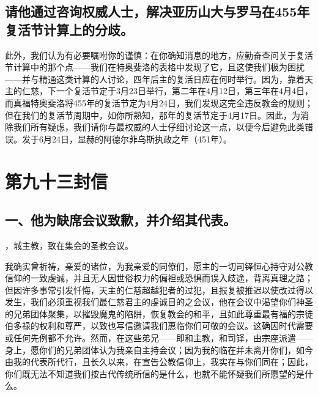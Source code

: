
\subsection{请他通过咨询权威人士，解决亚历山大与罗马在455年复活节计算上的分歧。}

此外，我们认为有必要嘱咐你的谨慎：在你确知消息的地方，应勤奋查问关于复活节计算中的那个点——我们在特奥斐洛的表格中发现了它，且这使我们极为困扰——并与精通这类计算的人讨论，四年后主的复活日应在何时举行。因为，靠着天主的仁慈，下一个复活节定于3月23日举行，第二年在4月12日，第三年在4月4日，而真福特奥斐洛将455年的复活节定为4月24日，我们发现这完全违反教会的规则；但在我们的复活节周期中，如你所熟知，那年的复活节定于4月17日。因此，为消除我们所有疑虑，我们请你与最权威的人士仔细讨论这一点，以便今后避免此类错误。发于6月24日，显赫的阿德尔菲乌斯执政之年（451年）。\par



\section{第九十三封信}

\par


\subsection{一、他为缺席会议致歉，并介绍其代表。}

，城主教，致在集会的圣教会议。\par

我确实曾祈祷，亲爱的诸位，为我亲爱的同僚们，愿主的一切司铎恒心持守对公教信仰的一致虔诚，并且无人因世俗权力的偏袒或恐惧而误入歧途，背离真理之路；但因许多事常引发忏悔，天主的仁慈超越犯者的过犯，且报复被推迟以使改过得以发生，我们必须重视我们最仁慈君主的虔诚目的之会议，他在会议中渴望你们神圣的兄弟团体聚集，以摧毁魔鬼的陷阱，恢复教会的和平，且如此尊重最有福的宗徒伯多禄的权利和尊严，以致也写信邀请我们惠临你们可敬的会议。这确因时代需要或任何先例都不允许。然而，在这些弟兄——即和主教，和司铎，由宗座派遣——身上，愿你们的兄弟团体认为我亲自主持会议；因为我的临在并未离开你们，如今由我的代表所代行，且长久以来，在宣告公教信仰上，我实在与你们同在；因此，你们既无法不知道我们按古代传统所信的是什么，也就不能怀疑我们所愿望的是什么。\par

